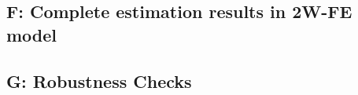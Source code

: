 \documentclass[12pt, a4paper, leqno]{article}
\begin{document}
\setcounter{table}{0}


\renewcommand\thefigure{E\arabic{figure}}
\renewcommand\thetable{E\arabic{table}}



\newpage

\subsection*{F: Complete estimation results in 2W-FE model}
\label{appendix:results}

\setcounter{figure}{0}

\setcounter{table}{0}


\renewcommand\thefigure{F\arabic{figure}}
\renewcommand\thetable{F\arabic{table}}



\newpage

\subsection*{G: Robustness Checks}
\label{rob_checks}

\setcounter{figure}{0}

\setcounter{table}{0}


\renewcommand\thefigure{G\arabic{figure}}
\renewcommand\thetable{G\arabic{table}}

\label{appendix:robustness}








\clearpage


\newpage
\appendix
\end{document}
